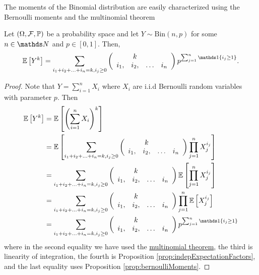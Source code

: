 The moments of the Binomial distribution are easily characterized
using the Bernoulli moments and the multinomial theorem
\begin{prop}
\label{prop:momentsBinomial}Let $\left(\Omega,\mathcal{F},\mathbb{\mathbb{\mathbb{P}}}\right)$ be a probability
space and let $Y\sim\mathrm{Bin}\left(n,p\right)$ for some $n\in\N$
and $p\in\left[0,1\right]$. Then,
\[
\E\left[Y^{k}\right]=\sum_{i_{1}+i_{2}+\ldots+i_{n}=k,i_{j}\geq0}\left(\begin{array}{cccc}
 & k\\
i_{1}, & i_{2}, & \ldots & i_{n}
\end{array}\right)p^{\sum_{j=1}^{n}\indicate\left\{ i_{j}\geq1\right\} }.
\]
\end{prop}

\begin{proof}
Note that $Y=\sum_{i=1}^{n}X_{i}$ where $X_{i}$ are i.i.d Bernoulli
random variables with parameter $p$. Then
\begin{align*}
\E\left[Y^{k}\right] & =\E\left[\left(\sum_{i=1}^{n}X_{i}\right)^{k}\right]\\
 & =\E\left[\sum_{i_{1}+i_{2}+\ldots+i_{n}=k,i_{j}\geq0}\left(\begin{array}{cccc}
 & k\\
i_{1}, & i_{2}, & \ldots & i_{n}
\end{array}\right)\prod_{j=1}^{n}X_{j}^{i_{j}}\right]\\
 & =\sum_{i_{1}+i_{2}+\ldots+i_{n}=k,i_{j}\geq0}\left(\begin{array}{cccc}
 & k\\
i_{1}, & i_{2}, & \ldots & i_{n}
\end{array}\right)\E\left[\prod_{j=1}^{n}X_{j}^{i_{j}}\right]\\
 & =\sum_{i_{1}+i_{2}+\ldots+i_{n}=k,i_{j}\geq0}\left(\begin{array}{cccc}
 & k\\
i_{1}, & i_{2}, & \ldots & i_{n}
\end{array}\right)\prod_{j=1}^{n}\E\left[X_{j}^{i_{j}}\right]\\
 & =\sum_{i_{1}+i_{2}+\ldots+i_{n}=k,i_{j}\geq0}\left(\begin{array}{cccc}
 & k\\
i_{1}, & i_{2}, & \ldots & i_{n}
\end{array}\right)p^{\sum_{j=1}^{n}\indicate\left\{ i_{j}\geq1\right\} }
\end{align*}
where in the second equality we have used the \hyperref[thm:multinomialTheorem]{multinomial theorem},
the third is linearity of integration, the fourth is Proposition \ref{prop:indepExpectationFactors},
and the last equality uses Proposition \ref{prop:bernoulliMoments}.
\end{proof}
